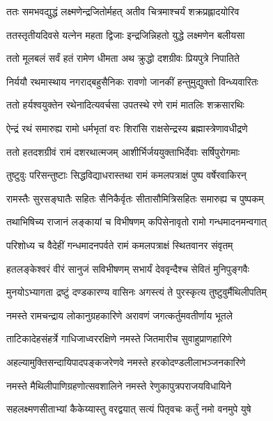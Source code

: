\twolineshloka
{ततः समभवद्युद्धं लक्ष्मणेन्द्रजितोर्महत्}
{अतीव चित्रमाश्चर्यं शक्रप्रह्लादयोरिव}%

\twolineshloka
{ततस्तृतीयदिवसे यत्नेन महता द्विजाः}
{इन्द्रजिन्निहतो युद्धे लक्ष्मणेन बलीयसा}%

\twolineshloka
{ततो मूलबलं सर्वं हतं रामेण धीमता}
{अथ क्रुद्धो दशग्रीवः प्रियपुत्रे निपातिते}%

\twolineshloka
{निर्ययौ रथमास्थाय नगराद्बहुसैनिकः}
{रावणो जानकीं हन्तुमुद्युक्तो विन्ध्यवारितः}%

\twolineshloka
{ततो हर्यश्वयुक्तेन रथेनादित्यवर्चसा}
{उपतस्थे रणे रामं मातलिः शक्रसारथिः}%

\twolineshloka
{ऐन्द्रं रथं समारुह्य रामो धर्मभृतां वरः}
{शिरांसि राक्षसेन्द्रस्य ब्रह्मास्त्रेणावधीद्रणे}%

\twolineshloka
{ततो हतदशग्रीवं रामं दशरथात्मजम्}
{आशीर्भिर्जययुक्ताभिर्देवाः सर्षिपुरोगमाः}%

\twolineshloka
{तुष्टुवुः परिसन्तुष्टाः सिद्धविद्याधरास्तथा}
{रामं कमलपत्राक्षं पुष्प वर्षेरवाकिरन्}%

\twolineshloka
{रामस्तैः सुरसङ्घातैः सहितः सैनिकैर्वृतः}
{सीतासौमित्रिसहितः समारुह्य च पुष्पकम्}%

\twolineshloka
{तथाभिषिच्य राजानं लङ्कायां च विभीषणम्}
{कपिसेनावृतो रामो गन्धमादनमन्वगात्}%

\twolineshloka
{परिशोध्य च वैदेहीं गन्धमादनपर्वते}
{रामं कमलपत्राक्षं स्थितवानर संवृतम्}%

\twolineshloka
{हतलङ्केश्वरं वीरं सानुजं सविभीषणम्}
{सभार्यं देववृन्दैश्च सेवितं मुनिपुङ्गवैः}%

\twolineshloka
{मुनयोऽभ्यागता द्रष्टुं दण्डकारण्य वासिनः}
{अगस्त्यं ते पुरस्कृत्य तुष्टुवुर्मैथिलीपतिम्}%


\twolineshloka
{नमस्ते रामचन्द्राय लोकानुग्रहकारिणे}
{अरावणं जगत्कर्तुमवतीर्णाय भूतले}%

\twolineshloka
{ताटिकादेहसंहर्त्रे गाधिजाध्वररक्षिणे}
{नमस्ते जितमारीच सुवाहुप्राणहारिणे}%

\twolineshloka
{अहल्यामुक्तिसन्दायिपादपङ्कजरेणवे}
{नमस्ते हरकोदण्डलीलाभञ्जनकारिणे}%

\twolineshloka
{नमस्ते मैथिलीपाणिग्रहणोत्सवशालिने}
{नमस्ते रेणुकापुत्रपराजयविधायिने}%

\twolineshloka
{सहलक्ष्मणसीताभ्यां कैकेय्यास्तु वरद्वयात्}
{सत्यं पितृवचः कर्तुं नमो वनमुपे युषे}%


